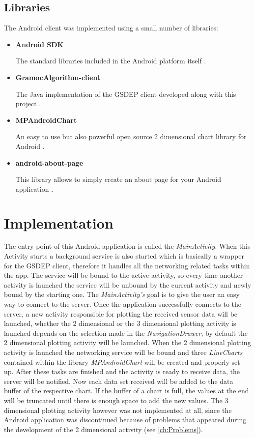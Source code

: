 \subsection{Libraries}
The Android client was implemented using a small number of libraries:
\begin{itemize}
	\item \textbf{Android SDK}

	The standard libraries included in the Android platform itself \cite{AndroidSDK}.

	\item \textbf{GramocAlgorithm-client}

	The Java implementation of the GSDEP client developed along with this project \cite{GramocAlgorithm-client}.

	\item \textbf{MPAndroidChart}

	An easy to use but also powerful open source 2 dimensional chart library for Android \cite{MPAndroidChart}.

	\item \textbf{android-about-page}

	This library allows to simply create an about page for your Android application \cite{android-about-page}.
\end{itemize}

\section{Implementation}
The entry point of this Android application is called the \emph{MainActivity}. When this Activity starts a background service is also started which is basically a wrapper for the GSDEP client, therefore it handles all the networking related tasks within the app. The service will be bound to the active activity, so every time another activity is launched the service will be unbound by the current activity and newly bound by the starting one. The \emph{MainActivity's} goal is to give the user an easy way to connect to the server. Once the application successfully connects to the server, a new activity responsible for plotting the received sensor data will be launched, whether the 2 dimensional or the 3 dimensional plotting activity is launched depends on the selection made in the \emph{NavigationDrawer}, by default the 2 dimensional plotting activity will be launched. When the 2 dimensional plotting activity is launched the networking service will be bound and three \emph{LineCharts} contained within the library \emph{MPAndroidChart} will be created and properly set up. After these tasks are finished and the activity is ready to receive data, the server will be notified. Now each data set received will be added to the data buffer of the respective chart. If the buffer of a chart is full, the values at the end will be truncated until there is enough space to add the new values. The 3 dimensional plotting activity however was not implemented at all, since the Android application was discontinued because of problems that appeared during the development of the 2 dimensional activity (see \autoref{ch:Problems}).
